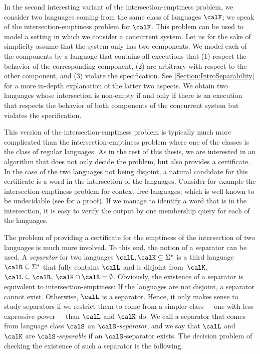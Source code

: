 \documentclass[../../diss.tex]{subfiles}
\begin{document}
In the second interesting variant of the intersection-emptiness problem, we consider two languages coming from the same class of languages $\calF$; we speak of the intersection-emptiness problem for $\calF$.
This problem can be used to model a setting in which we consider a concurrent system.
Let us for the sake of simplicity assume that the system only has two components.
We model each of the components by a language that contains all executions that (1) respect the behavior of the corresponding component, (2) are arbitrary with respect to the other component, and (3) violate the specification.
See \cref{Section:IntroSeparability} for a more in-depth explanation of the latter two aspects.
We obtain two languages whose intersection is non-empty if and only if there is an execution that respects the behavior of both components of the concurrent system but violates the specification.

This version of the intersection-emptiness problem is typically much more complicated than the intersection-emptiness problem where one of the classes is the class of regular languages.
As in the rest of this thesis, we are interested in an algorithm that does not only decide the problem, but also provides a certificate.
In the case of the two languages not being disjoint, a natural candidate for this certificate is a word in the intersection of the languages.
Consider for example the intersection-emptiness problem for context-free languages, which is well-known to be undecidable (see \eg \cite{HopcroftU79} for a proof).
If we manage to identify a word that is in the intersection, it is easy to verify the output by one membership query for each of the languages.

The problem of providing a certificate for the emptiness of the intersection of two languages is much more involved.
To this end, the notion of a separator can be used.
A \emph{separator} for two languages $\calL, \calK \subseteq \Sigma^*$ is a third language $\calR \subseteq \Sigma^*$ that fully contains $\calL$ and is disjoint from~$\calK$, \ie $\calL \subseteq \calR$, $\calK \cap \calR = \emptyset$.
Obviously, the existence of a separator is equivalent to intersection-emptiness:
If the languages are not disjoint, a separator cannot exist.
Otherwise, $\calL$ is a separator.
Hence, it only makes sense to study separators if we restrict them to come from a simpler \mbox{class~--~one} with less expressive power~--~than $\calL$ and $\calK$ do.
We call a separator that comes from language class $\calS$ an \emph{$\calS$-separator}, and we say that $\calL$ and $\calK$ are \emph{$\calS$-separable} if an $\calS$-separator exists.
The decision problem of checking the existence of such a separator is the following.
\end{document}
